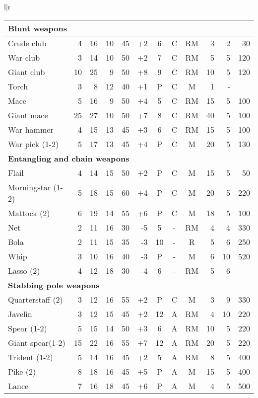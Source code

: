 \begin{tabular}[t]{l|r}
\begin{minipage}[t]{4.8in}
\begin{tabularx}{\linewidth}[t]{Xrrrrrcccrrr}
\multicolumn{12}{l}{\textbf{Blunt weapons}} \\ \hline
Crude club			& 4	& 16	& 10	& 45	& +2	& 6	& C	& RM	& 3	& 2	& 30 \\ \hline
War club			& 3	& 14	& 10	& 50	& +2	& 7	& C	& RM	& 5	& 5	& 120 \\ \hline
Giant club			& 10	& 25	& 9	& 50	& +8	& 9	& C	& RM	& 10	& 5	& 120 \\ \hline
Torch\footnotemark		& 3	& 8	& 12	& 40	& +1	& P	& C	& M	& 1	& -	&  \\ \hline
Mace				& 5	& 16	& 9	& 50	& +4	& 5	& C	& RM	& 15	& 5 	& 100 \\ \hline
Giant mace\footnotemark[2]	& 25	& 27	& 10	& 50	& +7	& 8	& C	& RM	& 40	& 5	& 100 \\ \hline
War hammer			& 4	& 15	& 13	& 45	& +3	& 6	& C	& RM	& 15	& 5	& 100 \\ \hline
War pick (1-2)			& 5	& 17	& 13	& 45	& +4	& P	& C	& M	& 20	& 5	& 130 \\ \hline

\multicolumn{12}{l}{\textbf{Entangling and chain weapons}} \\ \hline
Flail				& 4	& 14	& 15	& 50	& +2	& P	& C	& M	& 15	& 5	& 50 \\ \hline
Morningstar (1-2)		& 5	& 18	& 15	& 60	& +4	& P	& C	& M	& 20	& 5	& 220 \\ \hline
Mattock (2)			& 6	& 19	& 14	& 55	& +6	& P	& C	& M	& 18	& 5	& 100 \\ \hline
Net\footnotemark		& 2	& 11	& 16	& 30	& -5	& 5	& -	& RM	& 4	& 4	& 330 \\ \hline
Bola\footnotemark[14]		& 2	& 11	& 15	& 35	& -3	& 10	& -	& R	& 5	& 6	& 250 \\ \hline
Whip\footnotemark[14]\footnotemark & 3	& 10	& 16	& 40	& -3	& P	& -	& M	& 6	& 10	& 520 \\ \hline
Lasso (2)			& 4	& 12	& 18	& 30	& -4	& 6	& -	& RM	& 5	& 6	&  \\ \hline

\multicolumn{12}{l}{\textbf{Stabbing pole weapons}} \\ \hline
Quarterstaff (2)		& 3	& 12	& 16	& 55	& +2	& P	& C	& M	& 3	& 9	& 330 \\ \hline
Javelin\footnotemark		& 3	& 12	& 15	& 45	& +2	& 12	& A	& RM	& 4	& 10	& 220 \\ \hline
Spear (1-2)			& 5	& 15	& 14	& 50	& +3	& 6	& A	& RM	& 10	& 5	& 220 \\ \hline
Giant spear(1-2)\footnotemark[2] & 15	& 22	& 16	& 55	& +7	& 12	& A	& RM	& 20	& 5	& 220 \\ \hline
Trident (1-2)			& 5	& 14	& 16	& 45	& +2	& 5	& A	& RM	& 8	& 5	& 400 \\ \hline
Pike (2)\footnotemark		& 8	& 18	& 16	& 45	& +5	& P	& A	& M	& 15	& 5	& 400 \\ \hline
Lance\footnotemark 		& 7	& 16	& 18	& 45	& +6	& P	& A	& M	& 4	& 5	& 500 \\ \hline


\end{tabularx}
\end{minipage}
\end{tabular}

